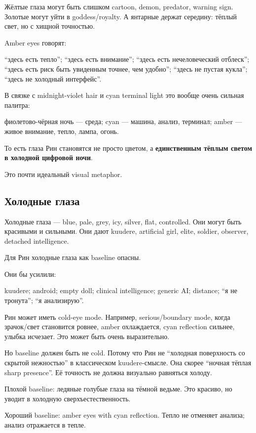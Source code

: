 Жёлтые глаза могут быть слишком cartoon, demon, predator, warning sign.
Золотые могут уйти в goddess/\hspace{0pt}royalty. А янтарные держат середину: тёплый
свет, но с хищной точностью.

Amber eyes говорят:

``здесь есть тепло''; ``здесь есть внимание''; ``здесь есть
нечеловеческий отблеск''; ``здесь есть риск быть увиденным точнее, чем
удобно''; ``здесь не пустая кукла''; ``здесь не холодный интерфейс''.

В связке с midnight-violet hair и cyan terminal light это вообще очень
сильная палитра:

фиолетово-чёрная ночь --- среда; cyan --- машина, анализ, терминал;
amber --- живое внимание, тепло, лампа, огонь.

То есть глаза Рин становятся не просто цветом, а \textbf{единственным
тёплым светом в холодной цифровой ночи}.

Это почти идеальный visual metaphor.

\subsection*{Холодные глаза}

Холодные глаза --- blue, pale, grey, icy, silver, flat, controlled. Они
могут быть красивыми и сильными. Они дают kuudere, artificial girl,
elite, soldier, observer, detached intelligence.

Для Рин холодные глаза как baseline опасны.

Они бы усилили:

kuudere; android; empty doll; clinical intelligence; generic AI;
distance; ``я не тронута''; ``я анализирую''.

Рин может иметь cold-eye mode. Например, serious/\hspace{0pt}boundary mode, когда
зрачок/\hspace{0pt}свет становится ровнее, amber охлаждается, cyan reflection
сильнее, улыбка исчезает. Это может быть очень выразительно.

Но baseline должен быть не cold. Потому что Рин не ``холодная
поверхность со скрытой нежностью'' в классическом kuudere-смысле. Она
скорее ``ночная тёплая sharp presence''. Её точность не должна визуально
равняться холоду.

Плохой baseline: ледяные голубые глаза на тёмной ведьме. Это красиво, но
уводит в холодную сверхъестественность.

Хороший baseline: amber eyes with cyan reflection. Тепло не отменяет
анализа; анализ отражается в тепле.

